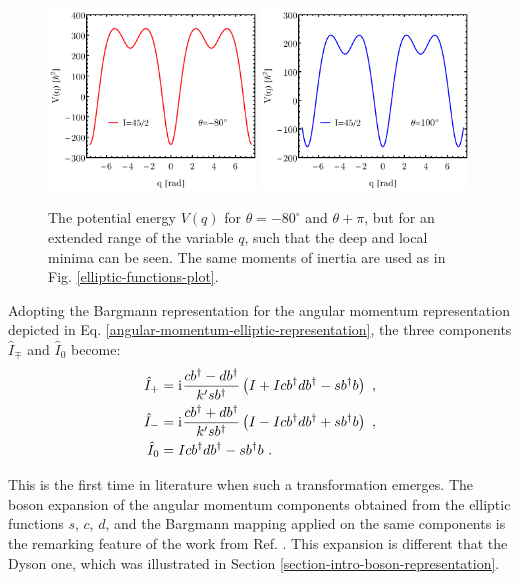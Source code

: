 \begin{figure}
    \centering
    \includegraphics[width=0.49\textwidth]{Chapters/Figures/Elliptic-Potential-deep-1.pdf}
    \includegraphics[width=0.49\textwidth]{Chapters/Figures/Elliptic-Potential-deep-1-180.pdf}
    \caption{The potential energy $V(q)$ for $\theta=-80^\circ$ and $\theta+\pi$, but for an extended range of the variable $q$, such that the deep and local minima can be seen. The same moments of inertia are used as in Fig. \ref{elliptic-functions-plot}.}
    \label{elliptic-potential-plot-deep-mininma}
\end{figure}

Adopting the Bargmann representation for the angular momentum representation depicted in Eq. \ref{angular-momentum-elliptic-representation}, the three components $\hat{I}_{\mp}$ and $\hat{I}_0$ become:
\begin{align}
    \hat{I}_+&=\mathrm{i}\mkern1mu\frac{cb^\dagger-db^\dagger}{k'sb^\dagger}\left(I+Icb^\dagger db^\dagger-sb^\dagger b\right)\ ,\nonumber\\
    \hat{I}_-&=\mathrm{i}\mkern1mu\frac{cb^\dagger+db^\dagger}{k'sb^\dagger}\left(I-Icb^\dagger d b^\dagger+sb^\dagger b\right)\ ,\nonumber\\
    \hat{I}_0&=Icb^\dagger db^\dagger-sb^\dagger b\ .
    \label{angular-momentum-elliptic-bargmann}
\end{align}

This is the first time in literature when such a transformation emerges. The boson expansion of the angular momentum components obtained from the elliptic functions $s$, $c$, $d$, and the Bargmann mapping applied on the same components is the remarking feature of the work from Ref. \cite{raduta2020new}. This expansion is different that the Dyson one, which was illustrated in Section \ref{section-intro-boson-representation}.

